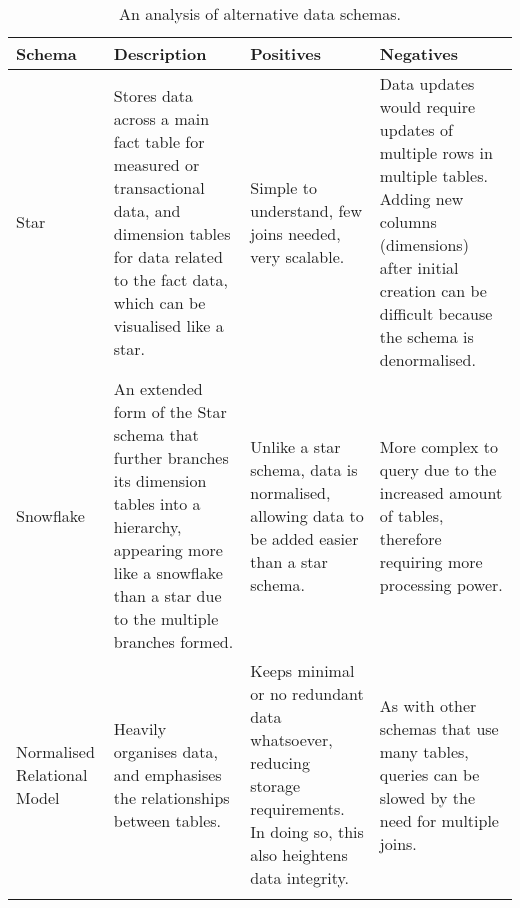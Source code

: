 \begin{longtable}{ |p{}| p{}| p{} | p{} | }
    \hline
    \cellcolor{blue!25}Schema & \cellcolor{blue!25}Description & \cellcolor{blue!25}Positives & \cellcolor{blue!25}Negatives \\
    \hline
    Star
    \autocite{kaminsky_star_nodate} & Stores data across a main fact table for measured or transactional data, and dimension tables 
    for data related to the fact data, which can be visualised like a star. & Simple to understand, few joins needed,
    very scalable. & Data updates would require updates of multiple rows in multiple tables. Adding new columns
    (dimensions) after initial creation can be difficult because the schema is denormalised.\\
    \hline
    Snowflake
    \autocite{geeksforgeeks_snowflake_2023} & An extended form of the Star schema that further branches its dimension tables
    into a hierarchy, appearing more like a snowflake than a star due to the multiple branches formed. &
    Unlike a star schema, data is normalised, allowing data to be added easier than a star schema. & More 
    complex to query due to the increased amount of tables, therefore requiring more processing power. \\
    \hline
    Normalised Relational Model 
    \autocite{microsoft_database_2024} & Heavily organises data, and emphasises the relationships between tables. &
    Keeps minimal or no redundant data whatsoever, reducing storage requirements. In doing so, this also heightens 
    data integrity. & As with other schemas that use many tables, queries can be slowed by the need for multiple 
    joins. \\
    \hline 
    \caption{An analysis of alternative data schemas.}\label{tab:Schemas}
\end{longtable}



